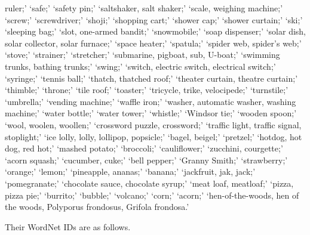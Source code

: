 \documentclass[10pt,twocolumn,letterpaper]{article}
\begin{document}
ruler;' `safe;' `safety pin;' `saltshaker, salt shaker;' `scale, weighing machine;' `screw;' `screwdriver;' `shoji;' `shopping cart;' `shower cap;' `shower curtain;' `ski;' `sleeping bag;' `slot, one-armed bandit;' `snowmobile;' `soap dispenser;' `solar dish, solar collector, solar furnace;' `space heater;' `spatula;' `spider web, spider's web;' `stove;' `strainer;' `stretcher;' `submarine, pigboat, sub, U-boat;' `swimming trunks, bathing trunks;' `swing;' `switch, electric switch, electrical switch;' `syringe;' `tennis ball;' `thatch, thatched roof;' `theater curtain, theatre curtain;' `thimble;' `throne;' `tile roof;' `toaster;' `tricycle, trike, velocipede;' `turnstile;' `umbrella;' `vending machine;' `waffle iron;' `washer, automatic washer, washing machine;' `water bottle;' `water tower;' `whistle;' `Windsor tie;' `wooden spoon;' `wool, woolen, woollen;' `crossword puzzle, crossword;' `traffic light, traffic signal, stoplight;' `ice lolly, lolly, lollipop, popsicle;' `bagel, beigel;' `pretzel;' `hotdog, hot dog, red hot;' `mashed potato;' `broccoli;' `cauliflower;' `zucchini, courgette;' `acorn squash;' `cucumber, cuke;' `bell pepper;' `Granny Smith;' `strawberry;' `orange;' `lemon;' `pineapple, ananas;' `banana;' `jackfruit, jak, jack;' `pomegranate;' `chocolate sauce, chocolate syrup;' `meat loaf, meatloaf;' `pizza, pizza pie;' `burrito;' `bubble;' `volcano;' `corn;' `acorn;' `hen-of-the-woods, hen of the woods, Polyporus frondosus, Grifola frondosa.'


Their WordNet IDs are as follows.
\end{document}
